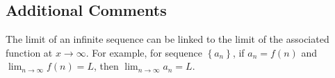 \subsection{Additional Comments}

The limit of an infinite sequence can be linked to the limit of the associated function at $x\rightarrow\infty$. For example, for sequence $\left\{a_n\right\}$, if $a_n=f(n)$ and $\lim_{n\rightarrow\infty}f(n)=L$, then $\lim_{n\rightarrow\infty}a_n=L$.










